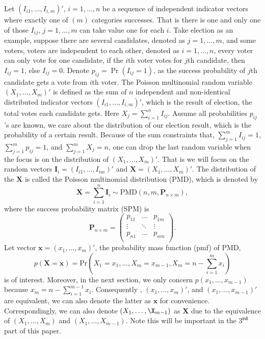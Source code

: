 \documentclass[12pt]{article}
\newcommand{\PMD}{\textrm{PMD}}
\begin{document}
Let $(I_{i1}, \ldots, I_{i,m})'$, $i = 1,\dots,n$ be a sequence of independent indicator vectors where exactly one of $(m)$ categories successes. That is there is one and only one of those $I_{ij}$, $j=1,\ldots, m$ can take value one for each $i$. Take election as an example, suppose there are several candidates, denoted as $j = 1,\dots,m$, and some voters, voters are independent to each other, denoted as $i = 1,\dots,n$, every voter can only vote for one candidate, if the $i$th voter votes for $j$th candidate, then $I_{ij} = 1$, else $I_{ij} = 0$.  Denote $p_{ij} = \Pr(I_{ij} = 1)$, as the success probability of $j$th candidate gets a vote from $i$th voter. The Poisson multinomial random variable $(X_1, \dots, X_m)' $ is defined as the sum of $n$ independent and non-identical distributed indicator vectors $(I_{i1}, \ldots, I_{i,m})'$, which is the result of election, the total votes each candidate gets. Here $X_j=\sum_{i=1}^{n}I_{ij}$. Assume all probabilities $p_{ij}$'s are known, we care about the distribution of our election result, which is the probability of a certain result. Because of the sum constraints that, $\sum_{j=1}^{m} I_{ij}= 1$, $\sum_{j=1}^{m} p_{ij}= 1$, and $\sum_{j=1}^{m} X_{j}= n$, one can drop the last random variable when the focus is on the distribution of $(X_1, \ldots, X_m)'$. That is we will focus on the random vectors $\boldsymbol{I}_i=(I_{i1}, \ldots, I_{im})'$ and $\boldsymbol{X}=(X_1, \ldots, X_m)'$. The distribution of the $\boldsymbol{X}$ is called the Poisson multinomial distribution (PMD), which is denoted by
$$\boldsymbol{X}  = \sum_{i = 1}^n \boldsymbol{I}_i \sim \PMD(n,m,\boldsymbol{P}_{n\times m}),$$
where the success probability matrix (SPM) is
\begin{equation*}
\boldsymbol{P}_{n \times m} = \begin{pmatrix}
p_{11} &  \dots & p_{1m} \\
\vdots & \ddots & \vdots \\
p_{n1} &  \dots & p_{nm} \\
\end{pmatrix}.
\end{equation*}
Let vector $\boldsymbol{x} = (x_1,\dots,x_m)'$, the probability mass function (pmf) of PMD,
$$p(\boldsymbol{X}=\boldsymbol{x}) = \text{Pr} \left( X_1 = x_1, \dots, X_m = x_{m-1}, X_{m} = n-\sum_{i=1}^{m}x_i \right)$$
is of interest. Moreover, in the next section, we only concern $p(x_1, \dots, x_{m-1})$ because $x_{m} = n-\sum_{i=1}^{m-1}x_i $. Consequently , $(x_{1},\dots,x_m)'$, and $(x_{1},\dots,x_{m-1})'$ are equivalent, we can also denote the latter as $\boldsymbol{x}$ for convenience. Correspondingly, we can also denote $(X_1,\dots,\X_{m-1})$ as $\boldsymbol{X}$ due to the equivalence of  $(X_1,\dots,X_m)$ and $(X_1,\dots,X_{m-1})$. Note this will be  important in the $3^{\textbf{rd}}$ part of this paper.\\
\end{document}

